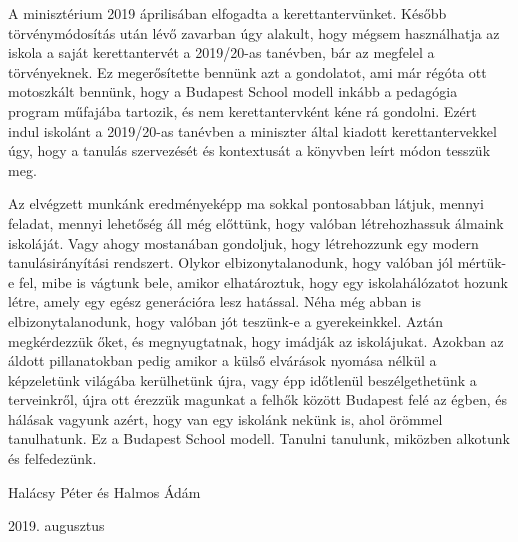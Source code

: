 A minisztérium 2019 áprilisában elfogadta a kerettantervünket. Később törvénymódosítás után lévő zavarban úgy alakult, hogy  mégsem használhatja az iskola a saját kerettantervét a 2019/20-as tanévben, bár az megfelel a törvényeknek. Ez megerősítette bennünk azt a gondolatot, ami már régóta ott motoszkált bennünk, hogy a Budapest School modell inkább a pedagógia program műfajába tartozik, és nem kerettantervként kéne rá gondolni. Ezért indul iskolánt a 2019/20-as tanévben a miniszter által kiadott kerettantervekkel úgy, hogy a tanulás szervezését és kontextusát a könyvben leírt módon tesszük meg.

Az elvégzett munkánk eredményeképp ma sokkal pontosabban látjuk, mennyi feladat, mennyi lehetőség áll még előttünk, hogy valóban létrehozhassuk álmaink iskoláját. Vagy ahogy mostanában gondoljuk, hogy létrehozzunk egy modern tanulásirányítási rendszert. Olykor elbizonytalanodunk, hogy valóban jól mértük-e fel, mibe is vágtunk bele, amikor elhatároztuk, hogy egy iskolahálózatot hozunk létre, amely egy egész generációra lesz hatással. Néha még abban is elbizonytalanodunk, hogy valóban jót teszünk-e a gyerekeinkkel. Aztán megkérdezzük őket, és megnyugtatnak, hogy imádják az iskolájukat. Azokban az áldott pillanatokban pedig amikor a külső elvárások nyomása nélkül a képzeletünk világába kerülhetünk újra, vagy épp időtlenül beszélgethetünk a terveinkről, újra ott érezzük magunkat a felhők között Budapest felé az égben, és hálásak vagyunk azért, hogy van egy iskolánk nekünk is, ahol örömmel tanulhatunk. Ez a Budapest School modell. Tanulni tanulunk, miközben alkotunk és felfedezünk. 



\bigskip
{
\raggedright Halácsy Péter és Halmos Ádám\\
\raggedright 2019. augusztus
}